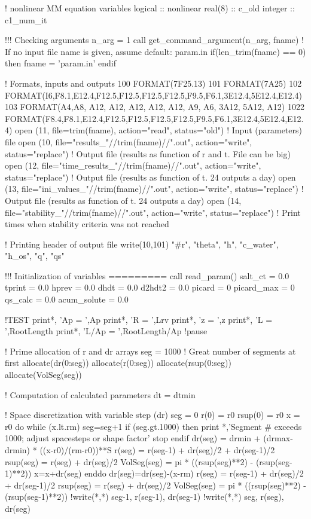 ! nonlinear MM equation variables
logical :: nonlinear
real(8) :: c_old
integer :: c1_num_it


!!! Checking arguments
n_arg = 1
call get_command_argument(n_arg, fname)
! If no input file name is given, assume default: param.in
if(len_trim(fname) == 0) then
  fname = 'param.in'
endif

! Formats, inputs and outputs
100  FORMAT(7F25.13)
101  FORMAT(7A25)
102  FORMAT(I6,F8.1,E12.4,F12.5,F12.5,F12.5,F12.5,F9.5,F6.1,3E12.4,5E12.4,E12.4)
103  FORMAT(A4,A8,  A12,  A12,  A12,  A12,  A12,  A9,  A6,  3A12,  5A12,  A12)
1022 FORMAT(F8.4,F8.1,E12.4,F12.5,F12.5,F12.5,F12.5,F9.5,F6.1,3E12.4,5E12.4,E12.4)
open (11, file=trim(fname), action="read", status="old")			! Input (parameters) file
open (10, file="results_"//trim(fname)//".out", action="write", status="replace")	! Output file (results as function of r and t. File can be big)
open (12, file="time_results_"//trim(fname)//".out", action="write", status="replace")	! Output file (results as function of t. 24 outputs a day)
open (13, file="ini_values_"//trim(fname)//".out", action="write", status="replace")	! Output file (results as function of t. 24 outputs a day)
open (14, file="stability_"//trim(fname)//".out", action="write", status="replace")	! Print times when stability criteria was not reached

! Printing header of output file
write(10,101) "#r", "theta", "h", "c_water", "h_os", "q", "qs"


!!! Initialization of variables =========
call read_param()
salt_ct     = 0.0
tprint      = 0.0
hprev       = 0.0
dhdt        = 0.0
d2hdt2      = 0.0
picard      = 0
picard_max  = 0
qs_calc     = 0.0
acum_solute = 0.0

!TEST
print*, 'Ap = ',Ap
print*, 'R = ',Lrv
print*, 'z = ',z
print*, 'L = ',RootLength
print*, 'L/Ap = ',RootLength/Ap
!pause

! Prime allocation of r and dr arrays
seg = 1000	! Great number of segments at first
allocate(dr(0:seg))
allocate(r(0:seg))
allocate(rsup(0:seg))
allocate(VolSeg(seg))

! Computation of calculated parameters
dt = dtmin

! Space discretization with variable step (dr)
seg = 0
r(0) = r0
rsup(0) = r0
x = r0
do while (x.lt.rm)
  seg=seg+1
  if (seg.gt.1000) then
     print *,'Segment # exceeds 1000; adjust spacesteps or shape factor'
     stop
  endif
  dr(seg) = drmin + (drmax-drmin) * ((x-r0)/(rm-r0))**S
  r(seg) = r(seg-1) + dr(seg)/2 + dr(seg-1)/2
  rsup(seg) = r(seg) + dr(seg)/2
  VolSeg(seg) = pi * ((rsup(seg)**2) - (rsup(seg-1)**2))
  x=x+dr(seg)
enddo
dr(seg)=dr(seg)-(x-rm)
r(seg) = r(seg-1) + dr(seg)/2 + dr(seg-1)/2
rsup(seg) = r(seg) + dr(seg)/2
VolSeg(seg) = pi * ((rsup(seg)**2) - (rsup(seg-1)**2))
!write(*,*) seg-1, r(seg-1), dr(seg-1)
!write(*,*) seg, r(seg), dr(seg)

